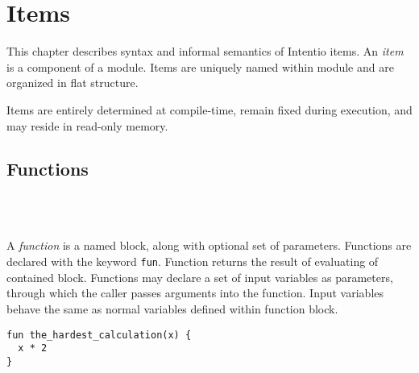 \chapter{Items}

This chapter describes syntax and informal semantics of Intentio items. An \emph{item} is a component of a module. Items are uniquely named within module and are organized in flat structure.

Items are entirely determined at compile-time, remain fixed during execution, and may reside in read-only memory.

\begin{bnf}
   \eq {} 
\end{bnf}

\section{Functions}

\begin{bnf}
   \eq {} \  \ \term{(} \  \ \term{)} \  \\
   \eq {} \  \ \gtry{\term{,}}
\end{bnf}

A \emph{function} is a named block, along with optional set of parameters. Functions are declared with the keyword \lstinline{fun}. Function returns the result of evaluating of contained block. Functions may declare a set of input variables as parameters, through which the caller passes arguments into the function. Input variables behave the same as normal variables defined within function block.

\begin{example}
\begin{lstlisting}
fun the_hardest_calculation(x) {
  x * 2
}
\end{lstlisting}
\end{example}
